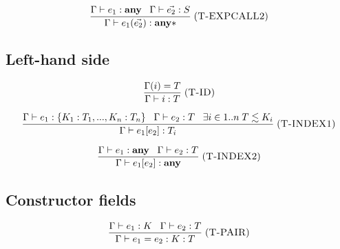 \documentclass[12pt]{article}
\newcommand{\Any}{\mathbf{any}}
\newcommand{\mylabel}[1]{\; (\textsc{#1})}
\newcommand{\env}{\Gamma}
\begin{document}
\[
\frac{\env \vdash e_{1}:\Any \;\;\;
      \env \vdash \vec{e_{2}}:S}
     {\env \vdash e_{1}(\vec{e_{2}}) : \Any{*}}
\mylabel{T-EXPCALL2}
\]

\subsection{Left-hand side}

\[
\frac{\env(i) = T}
     {\env \vdash i : T}
\mylabel{T-ID}
\]

\[
\frac{\env \vdash e_{1} : \{ K_{1}:T_{1}, ..., K_{n}:T_{n} \} \;\;\;
      \env \vdash e_{2} : T \;\;\;
      \exists i \in 1..n \; T \lesssim K_{i}}
     {\env \vdash e_{1}[e_{2}] : T_{i}}
\mylabel{T-INDEX1}
\]

\[
\frac{\env \vdash e_{1}:\Any \;\;\;
      \env \vdash e_{2}:T}
     {\env \vdash e_{1}[e_{2}] : \Any}
\mylabel{T-INDEX2}
\]

\subsection{Constructor fields}

\[
\frac{\env \vdash e_{1} : K \;\;\;
      \env \vdash e_{2} : T}
     {\env \vdash e_{1} = e_{2} : K:T}
\mylabel{T-PAIR}
\]
\end{document}
